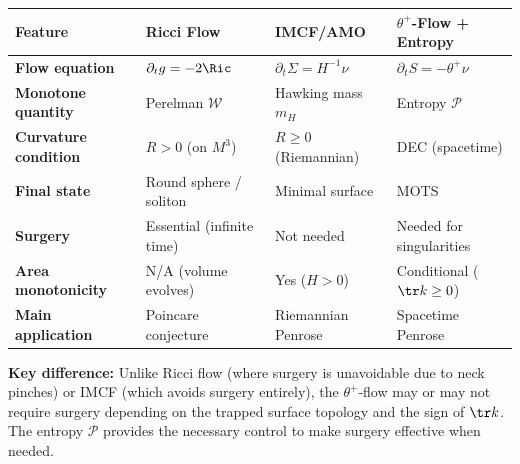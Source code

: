\begin{center}
\begin{tabular}{p{3cm}|p{4cm}|p{4cm}|p{4cm}}
\toprule
\textbf{Feature} & \textbf{Ricci Flow} & \textbf{IMCF/AMO} & \textbf{$\theta^+$-Flow + Entropy} \\
\midrule
\textbf{Flow equation} & $\partial_t g = -2\Ric$ & $\partial_t \Sigma = H^{-1}\nu$ & $\partial_t S = -\theta^+\nu$ \\
\midrule
\textbf{Monotone quantity} & Perelman $\mathcal{W}$ & Hawking mass $m_H$ & Entropy $\mathcal{P}$ \\
\midrule
\textbf{Curvature condition} & $R > 0$ (on $M^3$) & $R \geq 0$ (Riemannian) & DEC (spacetime) \\
\midrule
\textbf{Final state} & Round sphere / soliton & Minimal surface & MOTS \\
\midrule
\textbf{Surgery} & Essential (infinite time) & Not needed & Needed for singularities \\
\midrule
\textbf{Area monotonicity} & N/A (volume evolves) & Yes ($H > 0$) & Conditional ($\tr k \geq 0$) \\
\midrule
\textbf{Main application} & Poincare conjecture & Riemannian Penrose & Spacetime Penrose \\
\bottomrule
\end{tabular}
\end{center}

\textbf{Key difference:} Unlike Ricci flow (where surgery is unavoidable due to neck pinches) or IMCF (which avoids surgery entirely), the $\theta^+$-flow may or may not require surgery depending on the trapped surface topology and the sign of $\tr k$. The entropy $\mathcal{P}$ provides the necessary control to make surgery effective when needed.



